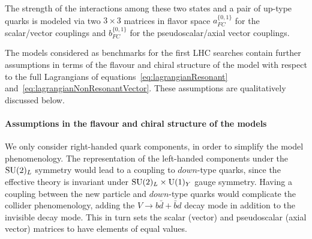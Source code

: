 The strength of the interactions among these two states and a pair
of up-type quarks is modeled via two $3\times 3$
matrices in flavor space $a^{\{0,1\}}_{FC}$ for the scalar/vector couplings
and $b^{\{0,1\}}_{FC}$ for the pseudoscalar/axial vector couplings.


 
The models considered as benchmarks for the first LHC searches
contain further assumptions in terms of the flavour and chiral structure of the model
with respect to the full Lagrangians of equations~\eqref{eq:lagrangianResonant} and~\eqref{eq:lagrangianNonResonantVector}.
These assumptions are qualitatively discussed below. 

\paragraph{Assumptions in the flavour and chiral structure of the models}

We only consider right-handed quark components, in order to simplify the model phenomenology. 
The representation of the left-handed components under the $\mathrm{SU}(2)_{L}$ symmetry would lead to a 
coupling to $down$-type quarks, since the effective theory is invariant under $\mathrm{SU}(2)_{L} \times \mathrm{U}(1)_{Y}$ 
gauge symmetry. Having a coupling between the new particle and $down$-type quarks 
would complicate the collider phenomenology, adding the
$V \to b\bar{d} + \bar{b}d$ decay mode in addition to the invisible decay mode. 
This in turn sets the scalar (vector) and pseudoscalar (axial vector) matrices to have 
elements of equal values. 


